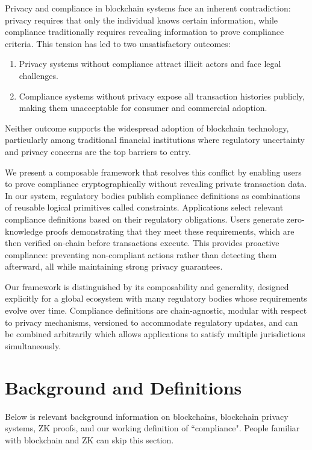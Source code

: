 \documentclass[9pt]{extreport}
\begin{document}
Privacy and compliance in blockchain systems face an inherent contradiction: privacy requires that only the individual knows certain information, while compliance traditionally requires revealing information to prove compliance criteria.  This tension has led to two unsatisfactory outcomes:
\begin{enumerate}
    \item Privacy systems without compliance attract illicit actors and face legal challenges.
    \item Compliance systems without privacy expose all transaction histories publicly, making them unacceptable for consumer and commercial adoption.
\end{enumerate}
Neither outcome supports the widespread adoption of blockchain technology, particularly among traditional financial institutions where regulatory uncertainty and privacy concerns are the top barriers to entry.

We present a composable framework that resolves this conflict by enabling users to prove compliance cryptographically without revealing private transaction data.  In our system, regulatory bodies publish compliance definitions as combinations of reusable logical primitives called constraints.  Applications select relevant compliance definitions based on their regulatory obligations.  Users generate zero-knowledge proofs demonstrating that they meet these requirements, which are then verified on-chain before transactions execute.  This provides proactive compliance: preventing non-compliant actions rather than detecting them afterward, all while maintaining strong privacy guarantees.

Our framework is distinguished by its composability and generality, designed explicitly for a global ecosystem with many regulatory bodies whose requirements evolve over time.  Compliance definitions are chain-agnostic, modular with respect to privacy mechanisms, versioned to accommodate regulatory updates, and can be combined arbitrarily which allows applications to satisfy multiple jurisdictions simultaneously.

\clearpage

\doublespacing

\chapter{Background and Definitions}
Below is relevant background information on blockchains, blockchain privacy systems, ZK proofs, and our working definition of ``compliance".  People familiar with blockchain and ZK can skip this section.
\end{document}
